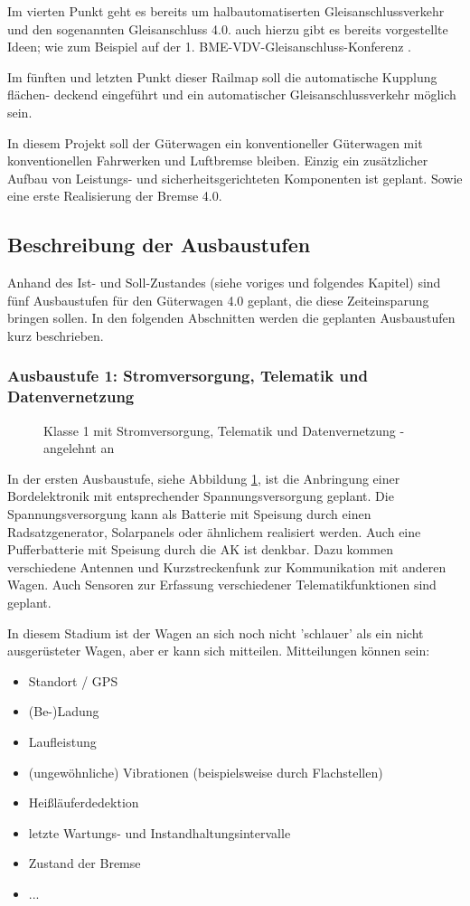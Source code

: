 Im vierten Punkt geht es bereits um halbautomatiserten Gleisanschlussverkehr und den sogenannten Gleisanschluss 4.0. auch hierzu gibt es bereits vorgestellte Ideen; wie zum Beispiel auf der 1. BME-VDV-Gleisanschluss-Konferenz \cite{GAK}. \par
Im fünften und letzten Punkt dieser Railmap soll die automatische Kupplung flächen- deckend eingeführt und ein automatischer Gleisanschlussverkehr möglich sein.\par
In diesem Projekt soll der Güterwagen ein konventioneller Güterwagen mit konventionellen Fahrwerken und Luftbremse bleiben. Einzig ein zusätzlicher Aufbau von Leistungs- und sicherheitsgerichteten Komponenten ist geplant. Sowie eine erste Realisierung der Bremse 4.0\cite{Stephenson, ETR_2}.\par

\subsection{Beschreibung der Ausbaustufen}\label{sec:Ausbaustufen}
Anhand des Ist- und Soll-Zustandes (siehe voriges und folgendes Kapitel) sind fünf Ausbaustufen für den Güterwagen 4.0 geplant, die diese Zeiteinsparung bringen sollen. In den folgenden Abschnitten werden die geplanten Ausbaustufen kurz beschrieben.\par

\subsubsection{Ausbaustufe 1: Stromversorgung, Telematik und Datenvernetzung}
\begin{figure}[hbp] 
    
    \caption{Klasse 1 mit Stromversorgung, Telematik und Datenvernetzung - angelehnt an \cite{ETR_3} }
    \label{fig:Klasse1}
\end{figure} 
In der ersten Ausbaustufe, siehe Abbildung \ref{fig:Klasse1}, ist die Anbringung einer Bordelektronik mit  entsprechender Spannungsversorgung geplant. Die Spannungsversorgung kann als Batterie mit Speisung durch einen Radsatzgenerator, Solarpanels oder ähnlichem realisiert werden. Auch eine Pufferbatterie mit Speisung durch die AK ist denkbar. Dazu kommen verschiedene Antennen und Kurzstreckenfunk zur Kommunikation mit anderen Wagen. Auch Sensoren zur Erfassung verschiedener Telematikfunktionen sind geplant.\par
In diesem Stadium ist der Wagen an sich noch nicht 'schlauer' als ein nicht ausgerüsteter Wagen, aber er kann sich mitteilen. Mitteilungen können sein: 
\begin{itemize}
    \item Standort / GPS
    \item (Be-)Ladung
    \item Laufleistung
    \item (ungewöhnliche) Vibrationen (beispielsweise durch Flachstellen)
    \item Heißläuferdedektion
    \item letzte Wartungs- und Instandhaltungsintervalle
    \item Zustand der Bremse
    \item ...
\end{itemize}

